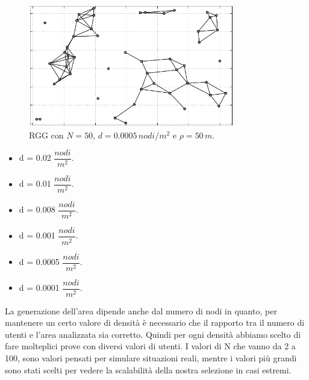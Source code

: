 \begin{figure}[t]
	\centering
	\includegraphics[width=0.8\textwidth, keepaspectratio]{Images/reti/RandomGeometricGraph_15}
	\caption{RGG con $ N=50 $, $ d=0.0005 \, nodi/m^2$ e $ \rho=50\,m$.}
	\label{fig:rgg_gen_02}
\end{figure}

\begin{itemize}
	\item d = 0.02 $ \dfrac{nodi}{m^{2}} $.
	\item d = 0.01 $ \dfrac{nodi}{m^{2}} $.
	\item d = 0.008 $ \dfrac{nodi}{m^{2}} $.
	\item d = 0.001 $ \dfrac{nodi}{m^{2}} $.
	\item d = 0.0005 $ \dfrac{nodi}{m^{2}} $.
	\item d = 0.0001 $ \dfrac{nodi}{m^{2}} $.
\end{itemize}
La generazione dell'area dipende anche dal numero di nodi in quanto, per mantenere un certo valore di densità è necessario che il rapporto tra il numero di utenti e l'area analizzata sia corretto. Quindi per ogni densità abbiamo scelto di fare molteplici prove con diversi valori di utenti. I valori di N che vanno da 2 a 100, sono valori pensati per simulare situazioni reali, mentre i valori più grandi sono stati scelti per vedere la scalabilità della nostra selezione in casi estremi.
\medskip


